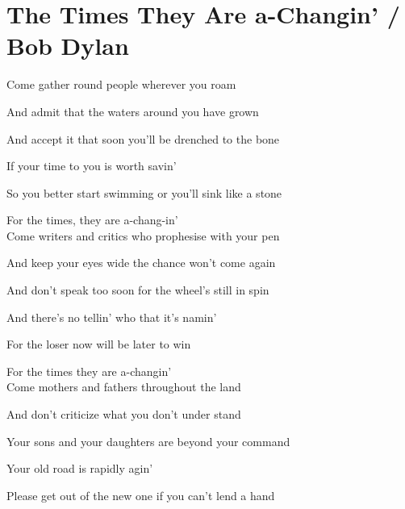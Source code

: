 \section{The Times They Are a-Changin' / Bob Dylan}\label{sec:times_they_are_a_changin}
\Cmajor
\Dmajor
\Gmajor
\Aminor
\Eminor

Come gather round people wherever you roam

And admit that the waters around you have grown

And accept it that soon you'll be drenched to the bone

If your time to you is worth savin'

So you better start swimming or you'll sink like a stone

For the times, they are a-chang-in'\\


Come writers and critics who prophesise with your pen 

And keep your eyes wide the chance won't come again

And don't speak too soon for the wheel's still in spin

And there's no tellin' who that it's namin'

For the loser now will be later to win

For the times they are a-changin'\\


Come mothers and fathers throughout the land

And don't criticize what you don't under stand

Your sons and your daughters are beyond your command

Your old road is rapidly agin'

Please get out of the new one if you can't lend a hand

